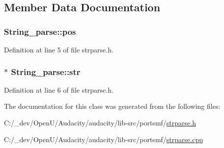 \subsection{Member Data Documentation}
\subsubsection[{\texorpdfstring{pos}{pos}}]{ String\+\_\+parse\+::pos}\hypertarget{class_string__parse_a47afb639351d5f028bf4f50caabf6c20}{}\label{class_string__parse_a47afb639351d5f028bf4f50caabf6c20}


Definition at line 5 of file strparse.\+h.

\subsubsection[{\texorpdfstring{str}{str}}]{$\ast$ String\+\_\+parse\+::str}\hypertarget{class_string__parse_ac1cbfaa0a933dd95eb77032682e22c41}{}\label{class_string__parse_ac1cbfaa0a933dd95eb77032682e22c41}


Definition at line 6 of file strparse.\+h.



The documentation for this class was generated from the following files\+:\begin{DoxyCompactItemize}
\item 
C\+:/\+\_\+dev/\+Open\+U/\+Audacity/audacity/lib-\/src/portsmf/\hyperlink{strparse_8h}{strparse.\+h}\item 
C\+:/\+\_\+dev/\+Open\+U/\+Audacity/audacity/lib-\/src/portsmf/\hyperlink{strparse_8cpp}{strparse.\+cpp}\end{DoxyCompactItemize}
